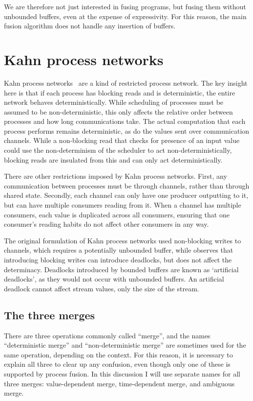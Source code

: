 We are therefore not just interested in fusing programs, but fusing them without unbounded buffers, even at the expense of expressivity.
For this reason, the main fusion algorithm does not handle any insertion of buffers.

\section{Kahn process networks}

Kahn process networks~\citep{kahn1976coroutines} are a kind of restricted process network.
The key insight here is that if each process has blocking reads and is deterministic, the entire network behaves deterministically.
While scheduling of processes must be assumed to be non-deterministic, this only affects the relative order between processes and how long communications take.
The actual computation that each process performs remains deterministic, as do the values sent over communication channels.
While a non-blocking read that checks for presence of an input value could use the non-determinism of the scheduler to act non-deterministically, blocking reads are insulated from this and can only act deterministically.

There are other restrictions imposed by Kahn process networks.
First, any communication between processes must be through channels, rather than through shared state.
Secondly, each channel can only have one producer outputting to it, but can have multiple consumers reading from it.
When a channel has multiple consumers, each value is duplicated across all consumers, ensuring that one consumer's reading habits do not affect other consumers in any way.

The original formulation of Kahn process networks used non-blocking writes to channels, which requires a potentially unbounded buffer, while \citet{parks1995bounded} observes that introducing blocking writes can introduce deadlocks, but does not affect the determinacy.
Deadlocks introduced by bounded buffers are known as `artificial deadlocks', as they would not occur with unbounded buffers.
An artificial deadlock cannot affect stream values, only the size of the stream.

\subsection{The three merges}
There are three operations commonly called ``merge'', and the names ``deterministic merge'' and ``non-deterministic merge'' are sometimes used for the same operation, depending on the context.
For this reason, it is necessary to explain all three to clear up any confusion, even though only one of these is supported by process fusion.
In this discussion I will use separate names for all three merges: value-dependent merge, time-dependent merge, and ambiguous merge.

